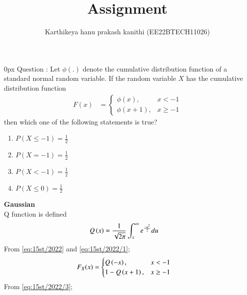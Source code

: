 \documentclass[article]{IEEEtran}
\theoremstyle{remark}
\begin{document}
\let\vec\mathbf


\title{
Assignment
}
\author{ Karthikeya hanu prakash kanithi (EE22BTECH11026)}
\maketitle
\parindent0px
\vspace{3cm}
Question : Let $\phi(.)$ denote the cumulative distribution function of a standard normal
random variable. If the random variable $X$ has the cumulative distribution
function 
\begin{align}
	F(x)&= 
    \begin{cases}
        \phi(x), &  x < -1 \\
        \phi(x+1) , &  x \ge -1
    \end{cases} \label{eq:15st/2022}
\end{align}
then which one of the following statements is true?
\begin{enumerate}
\item $P(X \leq -1) = \frac{1}{2}$
\item $P(X = -1) = \frac{1}{2}$
\item $P(X < -1) = \frac{1}{2}$
\item $P(X \leq 0) = \frac{1}{2}$
\end{enumerate}
\fi
\solution 
\textbf{Gaussian}\\
Q function is defined
\begin{align}
	Q\left(x\right) &= \frac{1}{\sqrt{2\pi}}\int_{x}^{\infty} e^{\frac{-u^2}{2}} du \label{eq:15st/2022/1}
\end{align}
From \eqref{eq:15st/2022} and \eqref{eq:15st/2022/1};
\begin{align}
	F_X(x) &= 
	\begin{cases}
        Q\left(-x\right) , &  x < -1 \\
        1-Q\left(x+1\right) , &  x \ge -1
        \end{cases} \label{eq:15st/2022/3}
\end{align}
From \eqref{eq:15st/2022/3};
\end{document}
